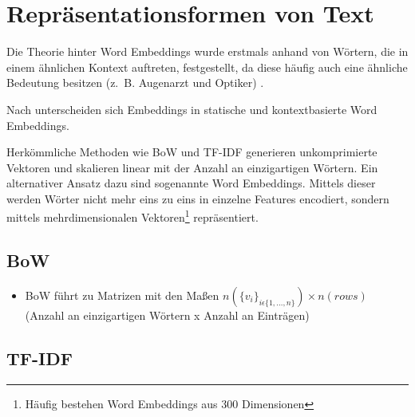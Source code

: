 


\section{Repräsentationsformen von Text}


Die Theorie hinter Word Embeddings wurde erstmals anhand von Wörtern, die in einem ähnlichen Kontext auftreten, festgestellt, da diese häufig auch eine ähnliche Bedeutung besitzen (z. B. Augenarzt und Optiker) \autocite[103]{jurafsky_speech_2023}.

Nach \textcite[103]{jurafsky_speech_2023} unterscheiden sich Embeddings in statische und kontextbasierte Word Embeddings.

Herkömmliche Methoden wie \ac{BoW} und \ac{TF-IDF} generieren unkomprimierte Vektoren und skalieren linear mit der Anzahl an einzigartigen Wörtern. Ein alternativer Ansatz dazu sind sogenannte Word Embeddings. Mittels dieser werden Wörter nicht mehr eins zu eins in einzelne Features encodiert, sondern mittels mehrdimensionalen Vektoren\footnote{Häufig bestehen Word Embeddings aus \num{300} Dimensionen} repräsentiert.

\subsection{\acl{BoW}}


\begin{itemize}
    \item \ac{BoW} führt zu Matrizen mit den Maßen \(n(\{v_i\}_{i\epsilon\{1,\dots,n\}}) \times n(rows)\) (Anzahl an einzigartigen Wörtern x Anzahl an Einträgen)
\end{itemize}

\subsection{\acl{TF-IDF}}

